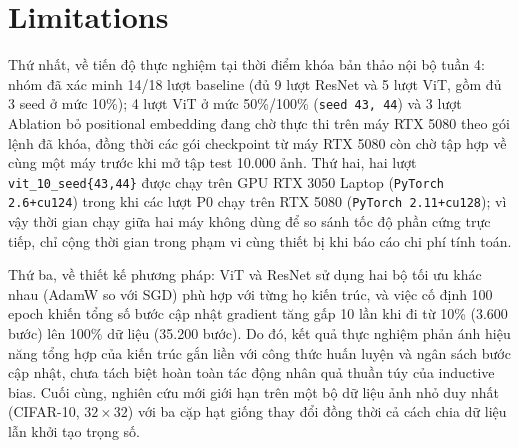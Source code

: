 \section*{Limitations}
Thứ nhất, về tiến độ thực nghiệm tại thời điểm khóa bản thảo nội bộ tuần 4: nhóm đã xác minh 14/18 lượt baseline (đủ 9 lượt ResNet và 5 lượt ViT, gồm đủ 3 seed ở mức 10\%); 4 lượt ViT ở mức 50\%/100\% (\texttt{seed 43, 44}) và 3 lượt Ablation bỏ positional embedding đang chờ thực thi trên máy RTX 5080 theo gói lệnh đã khóa, đồng thời các gói checkpoint từ máy RTX 5080 còn chờ tập hợp về cùng một máy trước khi mở tập test 10.000 ảnh. Thứ hai, hai lượt \texttt{vit\_10\_seed\{43,44\}} được chạy trên GPU RTX 3050 Laptop (\texttt{PyTorch 2.6+cu124}) trong khi các lượt P0 chạy trên RTX 5080 (\texttt{PyTorch 2.11+cu128}); vì vậy thời gian chạy giữa hai máy không dùng để so sánh tốc độ phần cứng trực tiếp, chỉ cộng thời gian trong phạm vi cùng thiết bị khi báo cáo chi phí tính toán.

Thứ ba, về thiết kế phương pháp: ViT và ResNet sử dụng hai bộ tối ưu khác nhau (AdamW so với SGD) phù hợp với từng họ kiến trúc, và việc cố định 100 epoch khiến tổng số bước cập nhật gradient tăng gấp 10 lần khi đi từ 10\% (3.600 bước) lên 100\% dữ liệu (35.200 bước). Do đó, kết quả thực nghiệm phản ánh hiệu năng tổng hợp của kiến trúc gắn liền với công thức huấn luyện và ngân sách bước cập nhật, chưa tách biệt hoàn toàn tác động nhân quả thuần túy của inductive bias. Cuối cùng, nghiên cứu mới giới hạn trên một bộ dữ liệu ảnh nhỏ duy nhất (CIFAR-10, $32\times32$) với ba cặp hạt giống thay đổi đồng thời cả cách chia dữ liệu lẫn khởi tạo trọng số.
